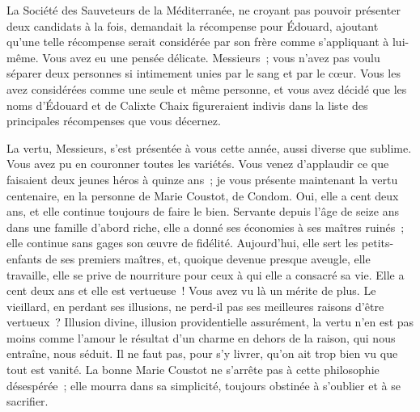 \documentclass[french,twoside]{book} %
\newcommand\orgName[1]{#1}
\newcommand\persName[1]{#1}
\newcommand\placeName[1]{#1}
\begin{document}
La {\orgName Société des Sauveteurs de la Méditerranée}, ne croyant pas pouvoir présenter deux candidats à la fois, demandait la récompense pour {\persName Édouard}, ajoutant qu’une telle récompense serait considérée par son frère comme s’appliquant à lui-même. Vous avez eu une pensée délicate. Messieurs ; vous n’avez pas voulu séparer deux personnes si intimement unies par le sang et par le cœur. Vous les avez considérées comme une seule et même personne, et vous avez décidé que les noms d’{\persName Édouard} et de {\persName Calixte Chaix} figureraient indivis dans la liste des principales récompenses que vous décernez.\par
La vertu, Messieurs, s’est présentée à vous cette année, aussi diverse que sublime. Vous avez pu en couronner toutes les variétés. Vous venez d’applaudir ce que faisaient deux jeunes héros à quinze ans ; je vous présente maintenant la vertu centenaire, en la personne de {\persName Marie Coustot}, de {\placeName Condom}. Oui, elle a cent deux ans, et elle continue toujours de faire le bien. Servante depuis l’âge de seize ans dans une famille d’abord riche, elle a donné ses économies à ses maîtres ruinés ; elle continue sans gages son œuvre de fidélité. Aujourd’hui, elle sert les petits-enfants de ses premiers maîtres, et, quoique devenue presque aveugle, elle travaille, elle se prive de nourriture pour ceux à qui elle a consacré sa vie. Elle a cent deux ans et elle est vertueuse ! Vous avez vu là un mérite de plus. Le vieillard, en perdant ses illusions, ne perd-il pas ses meilleures raisons d’être vertueux ? Illusion divine, illusion providentielle assurément, la vertu n’en est pas moins comme l’amour le résultat d’un charme en dehors de la raison, qui nous entraîne, nous séduit. Il ne faut pas, pour s’y livrer, qu’on ait trop bien vu que tout est vanité. La bonne {\persName Marie Coustot} ne s’arrête pas à cette philosophie désespérée ; elle mourra dans sa simplicité, toujours obstinée à s’oublier et à se sacrifier.\par
\end{document}
